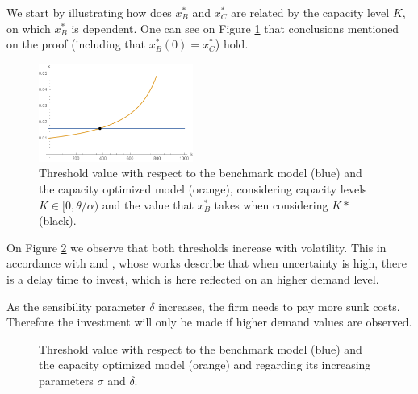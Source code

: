 We start by illustrating how does $x^*_B$ and $x^*_C$ are related by the capacity level $K$, on which $x^*_B$ is dependent. One can see on Figure \ref{fig:Kvar} that conclusions mentioned on the proof (including that $x^*_B(0)=x^*_C$) hold.

\begin{figure}[!htb]
	\centering
	\includegraphics[width=0.45\textwidth]{Prob1_CapOpt/xopt_k.pdf}
	\caption{Threshold value with respect to the benchmark model (blue) and the capacity optimized model (orange), considering capacity levels $K \in [0, \theta/\alpha)$ and the value that $x^*_B$ takes when considering $K*$ (black).}
	\label{fig:Kvar}
\end{figure}


On Figure \ref{fig:sigm} we observe that both thresholds increase with volatility. This in accordance with \cite{rita} and \cite{hagspiel:cap}, whose works describe that when uncertainty is high, there is a delay time to invest, which is here reflected on an higher demand level.

As the sensibility parameter $\delta$ increases, the firm needs to pay more sunk costs. Therefore the investment will only be made if higher demand values are observed.

\begin{figure}[!htb]
	\begin{subfigmatrix}{2}
	\end{subfigmatrix}
			\caption{Threshold value with respect to the benchmark model (blue) and the capacity optimized model (orange) and regarding its increasing parameters $\sigma$ and $\delta$.}
			\label{fig:sigm}
\end{figure}

